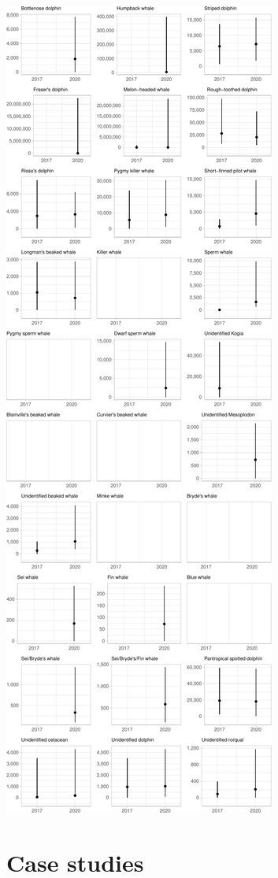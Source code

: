 \documentclass[
]{book}
\begin{document}
\includegraphics{figures/unnamed-chunk-303-1.pdf}

\hypertarget{part-case-studies-1}{%
\part{Case studies}\label{part-case-studies-1}}
\end{document}

